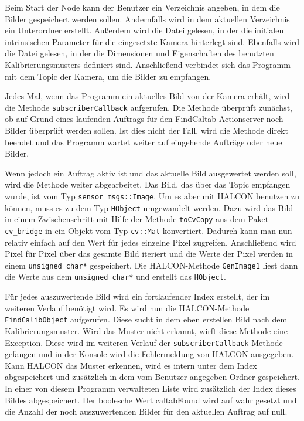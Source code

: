 Beim Start der Node kann der Benutzer ein Verzeichnis angeben, in dem die Bilder gespeichert werden sollen. Andernfalls wird in dem aktuellen Verzeichnis ein Unterordner erstellt. Außerdem wird die Datei gelesen, in der die initialen intrinsischen Parameter für die eingesetzte Kamera hinterlegt sind. Ebenfalls wird die Datei gelesen, in der die Dimensionen und Eigenschaften des benutzten Kalibrierungsmusters definiert sind.  Anschließend verbindet sich das Programm mit dem Topic der Kamera, um die Bilder zu empfangen.

Jedes Mal, wenn das Programm ein aktuelles Bild von der Kamera erhält, wird die Methode \texttt{subscriberCallback} aufgerufen. Die Methode überprüft zunächst, ob auf Grund eines laufenden Auftrags für den FindCaltab Actionserver noch Bilder überprüft werden sollen. Ist dies nicht der Fall, wird die Methode direkt beendet und das Programm wartet weiter auf eingehende Aufträge oder neue Bilder. 

Wenn jedoch ein Auftrag aktiv ist und das aktuelle Bild ausgewertet werden soll, wird die Methode weiter abgearbeitet. Das Bild, das über das Topic empfangen wurde, ist vom Typ \texttt{sensor\_msgs::Image}. Um es aber mit HALCON benutzen zu können, muss es zu dem Typ \texttt{HObject} umgewandelt werden. Dazu wird das Bild in einem Zwischenschritt mit Hilfe der Methode \texttt{toCvCopy} aus dem Paket \texttt{cv\_bridge} in ein Objekt vom Typ \texttt{cv::Mat} konvertiert. Dadurch kann man nun relativ einfach auf den Wert für jedes einzelne Pixel zugreifen. Anschließend wird Pixel für Pixel über das gesamte Bild iteriert und die Werte der Pixel werden in einem \texttt{unsigned char*} gespeichert. Die HALCON-Methode \texttt{GenImage1} liest dann die Werte aus dem \texttt{unsigned char*} und erstellt das \texttt{HObject}.

Für jedes auszuwertende Bild wird ein fortlaufender Index erstellt, der im weiteren Verlauf benötigt wird. Es wird nun die HALCON-Methode \texttt{FindCalibObject} aufgerufen. Diese sucht in dem eben erstellen Bild nach dem Kalibrierungsmuster. Wird das Muster nicht erkannt, wirft diese Methode eine Exception. Diese wird im weiteren Verlauf der \texttt{subscriberCallback}-Methode gefangen und in der Konsole wird die Fehlermeldung von HALCON ausgegeben. Kann HALCON das Muster erkennen, wird es intern unter dem Index abgespeichert und zusätzlich in dem vom Benutzer angegeben Ordner gespeichert. In einer von diesem Programm verwalteten Liste wird zusätzlich der Index dieses Bildes abgespeichert. Der boolesche Wert caltabFound wird auf wahr gesetzt und die Anzahl der noch auszuwertenden Bilder für den aktuellen Auftrag auf null. 

